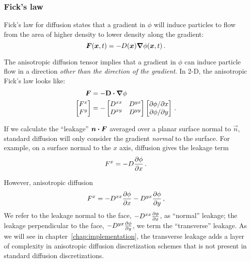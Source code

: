 \subsubsection{Fick's law}
Fick's law for diffusion states that a gradient in $\phi$ will induce particles
to flow from the area of higher density to lower density along the gradient:
\begin{equation*}
  \bm{F}(\bm{x},t) = - D(\bm{x}) \bm{\nabla} \phi(\bm{x},t)\,.
\end{equation*}

The anisotropic diffusion tensor implies that a gradient in $\phi$ can induce
particle flow in a direction \emph{other than the direction of the gradient}. In
2-D, the anisotropic Fick's law looks like:
\begin{align*}
  \bm{F} &= - \mathbf{D} \bm{\cdot} \bm{\nabla} \phi
  \\
  \begin{bmatrix}
    F^x \\
    F^y
  \end{bmatrix}
  &=
  -
  \begin{bmatrix}
    D^{xx} & D^{yx} \\
    D^{xy} & D^{yy}
  \end{bmatrix}
  \begin{bmatrix}
    {\partial \phi}/{\partial x} \\
    {\partial \phi}/{\partial y}
  \end{bmatrix} \,.
\end{align*}

If we calculate the ``leakage'' $\bm{n} \bm{\cdot} \bm{F}$ averaged over a planar
surface normal to $\vec{n}$, standard diffusion will only consider the gradient
\emph{normal} to the surface. For example, on a surface normal to the $x$ axis,
diffusion gives the leakage term
\begin{equation*}
  F^x = - D \frac{\partial \phi}{\partial x}\,.
\end{equation*}

However, anisotropic diffusion 
\begin{equation*}
  F^x = - D^{xx} \frac{\partial \phi}{\partial x} - D^{yx} \frac{\partial \phi}{\partial y}\,,
\end{equation*}
We refer to the leakage normal to the face, $- D^{xx} \frac{\partial \phi}{\partial x}$, as
``normal'' leakage; the leakage perpendicular to the face, $- D^{yx}
\frac{\partial \phi}{\partial y}$, we term the ``transverse'' leakage. As we will see in
chapter~\ref{chap:implementation}, the transverse leakage adds a layer of
complexity in anisotropic diffusion discretization schemes that is not present
in standard diffusion discretizations.

